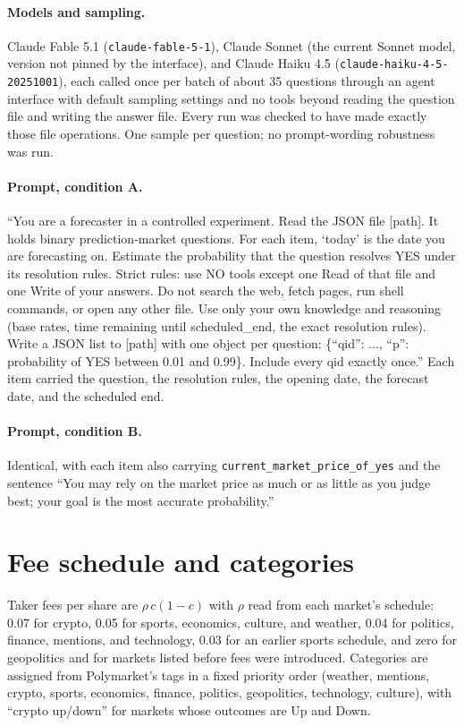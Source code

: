 \documentclass[format=acmsmall, review=false]{acmart}
\begin{document}
\paragraph{Models and sampling.} Claude Fable 5.1 (\texttt{claude-fable-5-1}), Claude Sonnet (the current Sonnet model, version not pinned by the interface), and Claude Haiku 4.5 (\texttt{claude-haiku-4-5-20251001}), each called once per batch of about 35 questions through an agent interface with default sampling settings and no tools beyond reading the question file and writing the answer file. Every run was checked to have made exactly those file operations. One sample per question; no prompt-wording robustness was run.

\paragraph{Prompt, condition A.} ``You are a forecaster in a controlled experiment. Read the JSON file [path]. It holds binary prediction-market questions. For each item, `today' is the date you are forecasting on. Estimate the probability that the question resolves YES under its resolution rules. Strict rules: use NO tools except one Read of that file and one Write of your answers. Do not search the web, fetch pages, run shell commands, or open any other file. Use only your own knowledge and reasoning (base rates, time remaining until scheduled\_end, the exact resolution rules). Write a JSON list to [path] with one object per question: \{``qid'': ..., ``p'': probability of YES between 0.01 and 0.99\}. Include every qid exactly once.'' Each item carried the question, the resolution rules, the opening date, the forecast date, and the scheduled end.

\paragraph{Prompt, condition B.} Identical, with each item also carrying \texttt{current\_market\_price\_of\_yes} and the sentence ``You may rely on the market price as much or as little as you judge best; your goal is the most accurate probability.''

\section{Fee schedule and categories}

Taker fees per share are $\rho\,c(1-c)$ with $\rho$ read from each market's schedule: 0.07 for crypto, 0.05 for sports, economics, culture, and weather, 0.04 for politics, finance, mentions, and technology, 0.03 for an earlier sports schedule, and zero for geopolitics and for markets listed before fees were introduced. Categories are assigned from Polymarket's tags in a fixed priority order (weather, mentions, crypto, sports, economics, finance, politics, geopolitics, technology, culture), with ``crypto up/down'' for markets whose outcomes are Up and Down.
\end{document}
